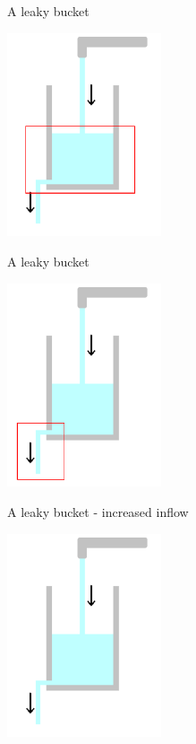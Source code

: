 \documentclass{beamer}
\begin{document}
\begin{frame}{A leaky bucket}

  \begin{center}
    \includegraphics[height=6cm]{glass_contents.png}
  \end{center}
  
  
\end{frame}

\begin{frame}{A leaky bucket}

  \begin{center}
    \includegraphics[height=6cm]{glass_out.png}
  \end{center}
  
  
\end{frame}


\begin{frame}{A leaky bucket - increased inflow}

  \begin{center}
    \includegraphics[height=6cm]{glass.png}
  \end{center}
  
  
\end{frame}
\end{document}
